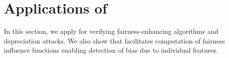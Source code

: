 \section{Applications of {\fvgm}}\label{fairness_fvgm_sec:applications}
In this section, we apply {\fvgm} for verifying fairness-enhancing algorithms and depreciation attacks. We also show that {\fvgm} facilitates computation of fairness influence functions enabling detection of bias due to individual features. 

